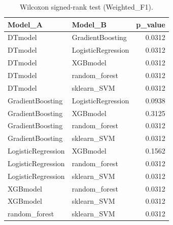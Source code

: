 \begin{table}[t]
\centering
\begin{tabular}{llr}
\toprule
Model_A & Model_B & p_value \\
\midrule
DTmodel & GradientBoosting & 0.0312 \\
DTmodel & LogisticRegression & 0.0312 \\
DTmodel & XGBmodel & 0.0312 \\
DTmodel & random_forest & 0.0312 \\
DTmodel & sklearn_SVM & 0.0312 \\
GradientBoosting & LogisticRegression & 0.0938 \\
GradientBoosting & XGBmodel & 0.3125 \\
GradientBoosting & random_forest & 0.0312 \\
GradientBoosting & sklearn_SVM & 0.0312 \\
LogisticRegression & XGBmodel & 0.1562 \\
LogisticRegression & random_forest & 0.0312 \\
LogisticRegression & sklearn_SVM & 0.0312 \\
XGBmodel & random_forest & 0.0312 \\
XGBmodel & sklearn_SVM & 0.0312 \\
random_forest & sklearn_SVM & 0.0312 \\
\bottomrule
\end{tabular}
\caption{Wilcoxon signed-rank test (Weighted_F1).}
\label{tab:wilcoxon_Weighted_F1}
\end{table}